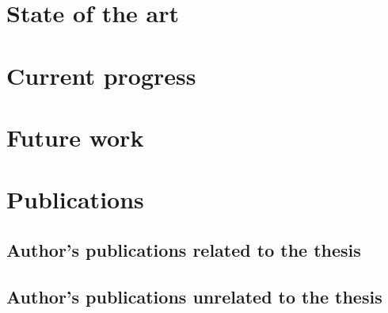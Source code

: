\documentclass[11pt]{article}
\begin{document}
\section{State of the art}
\label{sec:state_of_the_art}


\section{Current progress}
\label{sec:current_progress}


\section{Future work}
\label{sec:future-work}


\section{Publications}
\label{sec:publications}\nocite{*}

\subsection*{Author's publications related to the thesis}
\printbibliography[keyword=related,heading=none]

\subsection*{Author's publications unrelated to the thesis}
\printbibliography[keyword=unrelated,heading=none]

\printbibliography[keyword=foreign]
\end{document}
